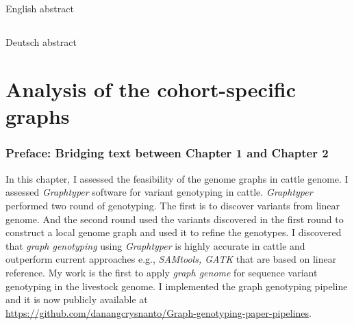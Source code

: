 \documentclass[12 pt, a4paper, notitlepage]{report}
\begin{document}
\newcommand*{\BuildingFromMainFile}{}






\setcounter{tocdepth}{1}
\hypersetup{linkcolor=black}
\tableofcontents
{}
\newpage

\listoffigures 
{}
\newpage

\listoftables 
{}
\newpage

\thispagestyle{plain}
\section*{}


English abstract

\newpage

\thispagestyle{plain}
\section*{}

Deutsch abstract

\newpage



\chapter{Analysis of the cohort-specific graphs}
\subsection*{Preface: Bridging text between Chapter 1 and Chapter 2}
\label{chap:locgraph}
In this chapter, I assessed the feasibility of the genome graphs in cattle genome. I assessed \emph{Graphtyper} software for variant genotyping in cattle.  \emph{Graphtyper} performed two round of genotyping. The first is to discover variants from linear
genome. And the second round used the variants discovered in the first round to construct a local genome graph and used it to refine the genotypes. I discovered that \textit{graph genotyping} using \textit{Graphtyper} is highly accurate in cattle and outperform current approaches e.g., \textit{SAMtools, \emph{GATK}} that are based on linear reference. My work is the first to apply \textit{graph genome} for sequence variant genotyping in the livestock genome.  I implemented the graph genotyping pipeline and it is now publicly available at \\  
\url{https://github.com/danangcrysnanto/Graph-genotyping-paper-pipelines}.
\onehalfspacing


%


\chapter*{}
\singlespacing
{}

\end{document}
